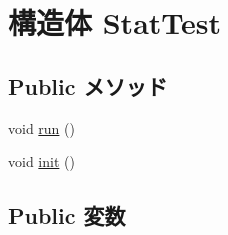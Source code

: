 \hypertarget{structStatTest}{
\section{構造体 StatTest}
\label{structStatTest}
}
\subsection*{Public メソッド}
\begin{DoxyCompactItemize}
\item 
void \hyperlink{structStatTest_a13a43e6d814de94978c515cb084873b1}{run} ()
\item 
void \hyperlink{structStatTest_a02fd73d861ef2e4aabb38c0c9ff82947}{init} ()
\end{DoxyCompactItemize}
\subsection*{Public 変数}
